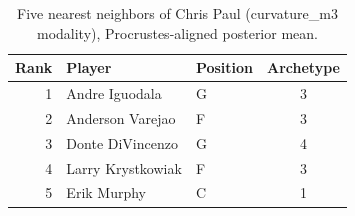 \begin{table}[htbp]
  \centering\small
  \begin{tabular}{rllc}
    \toprule
    Rank & Player & Position & Archetype \\
    \midrule
    1 & Andre Iguodala & G & 3 \\
    2 & Anderson Varejao & F & 3 \\
    3 & Donte DiVincenzo & G & 4 \\
    4 & Larry Krystkowiak & F & 3 \\
    5 & Erik Murphy & C & 1 \\
    \bottomrule
  \end{tabular}
  \caption{Five nearest neighbors of Chris Paul (curvature_m3 modality), Procrustes-aligned posterior mean.}
  \label{tab:Chris_Paul_neighbors_curvature_m3}
\end{table}

